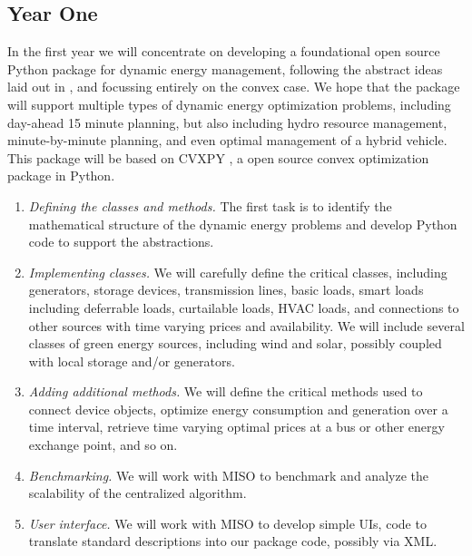 \documentclass[12pt]{article}
\begin{document}
\subsection{Year One}
In the first year
we will concentrate on developing a foundational open source 
Python package for dynamic energy management,
following the abstract ideas laid out in \cite{kraning2014dynamic},
and focussing entirely on the convex case.
We hope that the package will support multiple types of 
dynamic energy optimization problems, including day-ahead 15 minute 
planning, but also including hydro resource management, minute-by-minute
planning, and even optimal management of a hybrid vehicle.
This package will be based on CVXPY \cite{cvxpy},
a open source convex optimization package in Python.
\begin{enumerate}
\item \emph{Defining the classes and methods.}  The first task is to 
identify the mathematical structure of the dynamic energy problems 
and develop Python code to support the abstractions.
\item \emph{Implementing classes.}
We will carefully define the critical classes,
including generators, storage devices, transmission lines,
basic loads, smart loads including deferrable loads, curtailable loads, 
HVAC loads, and connections to other sources with time varying prices 
and availability.
We will include several classes of green energy sources, 
including wind and solar,
possibly coupled with local storage and/or generators.
\item \emph{Adding additional methods.}
We will define the critical methods used to connect device objects,
optimize energy consumption and generation over a time interval,
retrieve time varying optimal prices at a bus or other 
energy exchange point, and so on.
\item \emph{Benchmarking.}
We will work with MISO to benchmark and analyze the scalability of the 
centralized algorithm.
\item \emph{User interface.} We will work with MISO to develop simple UIs,
code to translate standard descriptions into our package code, possibly
via XML.
\end{enumerate}
\end{document}
